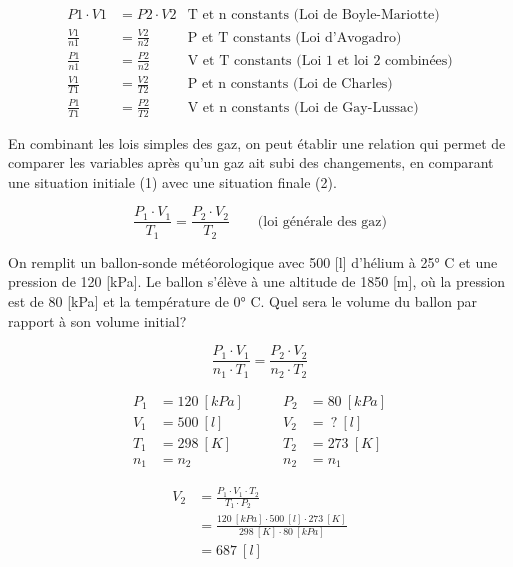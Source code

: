 \documentclass[
  11pt,
  a4paper,
  openany]{book}
\begin{document}
\[
\begin{aligned}
P1 \cdot V1 &= P2 \cdot V2 & \text{T et n constants (Loi de Boyle-Mariotte)} \\[1em]
\frac{V1}{n1} &= \frac{V2}{n2} & \text{P et T constants (Loi d'Avogadro)} \\[1em]
\frac{P1}{n1} &= \frac{P2}{n2} & \text{V et T constants (Loi 1 et loi 2 combinées)} \\[1em]
\frac{V1}{T1} &= \frac{V2}{T2} & \text{P et n constants (Loi de Charles)} \\[1em]
\frac{P1}{T1} &= \frac{P2}{T2} & \text{V et n constants (Loi de Gay-Lussac)}
\end{aligned}
\]

En combinant les lois simples des gaz, on peut établir une relation qui permet de comparer les variables après qu'un gaz ait subi des changements, en comparant une situation initiale (1) avec une situation finale (2).

\[
\frac{P_1 \cdot V_1}{T_1} = \frac{P_2 \cdot V_2}{T_2} \qquad \text{(loi générale des gaz)}
\]

\begin{Exercise}

On remplit un ballon-sonde météorologique avec 500 {[}l{]} d'hélium à 25° C et une pression de 120 {[}kPa{]}. Le ballon s'élève à une altitude de 1850 {[}m{]}, où la pression est de 80 {[}kPa{]} et la température de 0° C. Quel sera le volume du ballon par rapport à son volume initial?


\end{Exercise}

\begin{Answer}
\[
\frac{P_1 \cdot V_1}{n_1 \cdot T_1} = \frac{P_2 \cdot V_2}{n_2 \cdot T_2}
\]

\[
\begin{split}
    P_1 &= 120\ [kPa]\\
    V_1 &= 500\ [l]\\
    T_1 &= 298\ [K]\\
    n_1 &= n_2
\end{split}
\qquad
\begin{split}
    P_2 &= 80\ [kPa]\\
    V_2 &=\ ?\ [l]\\
    T_2 &= 273\ [K]\\
    n_2 &= n_1
\end{split}
\]

\[
\begin{split}
    V_2 &= \frac{P_1 \cdot V_1 \cdot T_2}{T_1 \cdot P_2} \\
    &= \frac{120\ [kPa] \cdot 500\ [l] \cdot 273\ [K]}{298\ [K] \cdot 80\ [kPa]} \\
    &= 687\ [l]
\end{split}
\]

\end{Answer}
\end{document}
